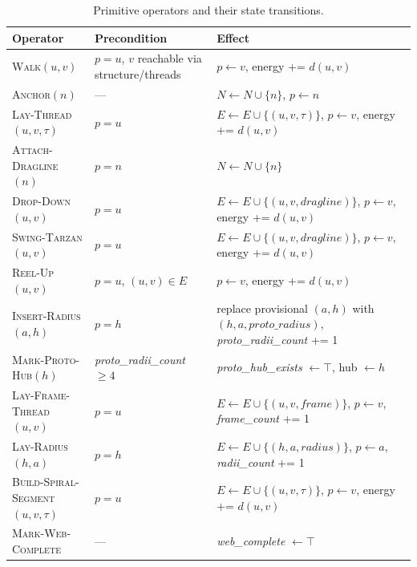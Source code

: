 \begin{table}[H]
\centering
{\footnotesize
\setlength{\tabcolsep}{4pt}
\begin{tabularx}{\linewidth}{@{}l>{\raggedright\arraybackslash}p{3.5cm}>{\raggedright\arraybackslash}X@{}}
\toprule
\textbf{Operator} & \textbf{Precondition} & \textbf{Effect} \\
\midrule
\textsc{Walk}$(u, v)$ & $p{=}u$, $v$ reachable via structure/threads & $p \gets v$, energy += $d(u, v)$ \\
\textsc{Anchor}$(n)$ & --- & $N \gets N \cup \{n\}$, $p \gets n$ \\
\textsc{Lay-Thread}$(u, v, \tau)$ & $p{=}u$ & $E \gets E \cup \{(u, v, \tau)\}$, $p \gets v$, energy += $d(u, v)$ \\
\textsc{Attach-Dragline}$(n)$ & $p{=}n$ & $N \gets N \cup \{n\}$ \\
\textsc{Drop-Down}$(u, v)$ & $p{=}u$ & $E \gets E \cup \{(u, v, \textit{dragline})\}$, $p \gets v$, energy += $d(u, v)$ \\
\textsc{Swing-Tarzan}$(u, v)$ & $p{=}u$ & $E \gets E \cup \{(u, v, \textit{dragline})\}$, $p \gets v$, energy += $d(u, v)$ \\
\textsc{Reel-Up}$(u, v)$ & $p{=}u$, $(u, v) \in E$ & $p \gets v$, energy += $d(u, v)$ \\
\textsc{Insert-Radius}$(a, h)$ & $p{=}h$ & replace provisional $(a, h)$ with $(h, a, \textit{proto\_radius})$, \textit{proto\_radii\_count} += 1 \\
\textsc{Mark-Proto-Hub}$(h)$ & \textit{proto\_radii\_count} $\geq 4$ & \textit{proto\_hub\_exists} $\gets \top$, hub $\gets h$ \\
\textsc{Lay-Frame-Thread}$(u, v)$ & $p{=}u$ & $E \gets E \cup \{(u, v, \textit{frame})\}$, $p \gets v$, \textit{frame\_count} += 1 \\
\textsc{Lay-Radius}$(h, a)$ & $p{=}h$ & $E \gets E \cup \{(h, a, \textit{radius})\}$, $p \gets a$, \textit{radii\_count} += 1 \\
\textsc{Build-Spiral-Segment}$(u, v, \tau)$ & $p{=}u$ & $E \gets E \cup \{(u, v, \tau)\}$, $p \gets v$, energy += $d(u, v)$ \\
\textsc{Mark-Web-Complete} & --- & \textit{web\_complete} $\gets \top$ \\
\bottomrule
\end{tabularx}}
\caption{Primitive operators and their state transitions.}
\label{tab:orig-operators}
\end{table}

